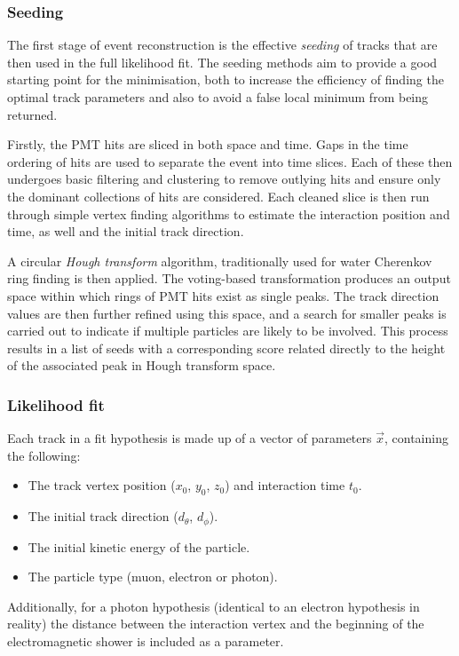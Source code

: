 \subsubsection*{Seeding} %

The first stage of event reconstruction is the effective \emph{seeding} of tracks that are then
used in the full likelihood fit. The seeding methods aim to provide a good starting point for the
minimisation, both to increase the efficiency of finding the optimal track parameters and also to
avoid a false local minimum from being returned.

Firstly, the PMT hits are sliced in both space and time. Gaps in the time ordering of hits are
used to separate the event into time slices. Each of these then undergoes basic filtering and
clustering to remove outlying hits and ensure only the dominant collections of hits are
considered. Each cleaned slice is then run through simple vertex finding algorithms to estimate
the interaction position and time, as well and the initial track direction.

A circular \emph{Hough transform} algorithm, traditionally used for water Cherenkov ring finding
is then applied. The voting-based transformation produces an output space within which rings of
PMT hits exist as single peaks. The track direction values are then further refined using this
space, and a search for smaller peaks is carried out to indicate if multiple particles are likely
to be involved. This process results in a list of seeds with a corresponding score related
directly to the height of the associated peak in Hough transform space.

\subsubsection*{Likelihood fit} %

Each track in a fit hypothesis is made up of a vector of parameters $\vec{x}$, containing the
following:
\begin{itemize}
    \item The track vertex position ($x_{0}$, $y_{0}$, $z_{0}$) and interaction time $t_{0}$.
    \item The initial track direction ($d_{\theta}$, $d_{\phi}$).
    \item The initial kinetic energy of the particle.
    \item The particle type (muon, electron or photon).
\end{itemize}
Additionally, for a photon hypothesis (identical to an electron hypothesis in reality) the
distance between the interaction vertex and the beginning of the electromagnetic shower is
included as a parameter.

